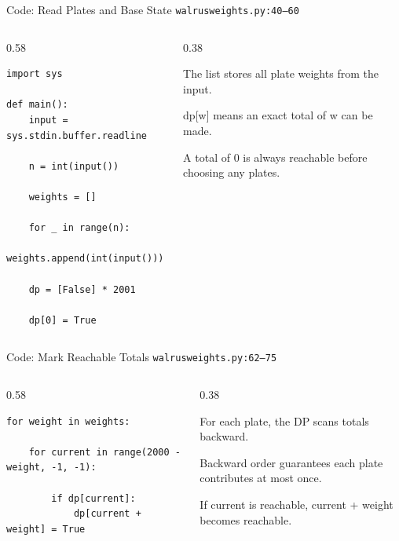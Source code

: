\documentclass[aspectratio=169,11pt]{beamer}
\begin{document}
\begin{frame}[fragile]{Code: Read Plates and Base State}
\scriptsize
{} \texttt{walrusweights.py:40--60}

\vspace{0.08cm}
\begin{columns}[T,totalwidth=\textwidth]
\begin{column}{0.58\textwidth}
\begin{lstlisting}[style=cpcode]
import sys

def main():
    input = sys.stdin.buffer.readline

    n = int(input())

    weights = []

    for _ in range(n):
        weights.append(int(input()))

    dp = [False] * 2001

    dp[0] = True
\end{lstlisting}
\end{column}
\begin{column}{0.38\textwidth}
\begin{tightitemize}
  \item The list stores all plate weights from the input.
  \item dp[w] means an exact total of w can be made.
  \item A total of 0 is always reachable before choosing any plates.
\end{tightitemize}
\end{column}
\end{columns}
\end{frame}

\begin{frame}[fragile]{Code: Mark Reachable Totals}
\scriptsize
{} \texttt{walrusweights.py:62--75}

\vspace{0.08cm}
\begin{columns}[T,totalwidth=\textwidth]
\begin{column}{0.58\textwidth}
\begin{lstlisting}[style=cpcode]
for weight in weights:

    for current in range(2000 - weight, -1, -1):

        if dp[current]:
            dp[current + weight] = True
\end{lstlisting}
\end{column}
\begin{column}{0.38\textwidth}
\begin{tightitemize}
  \item For each plate, the DP scans totals backward.
  \item Backward order guarantees each plate contributes at most once.
  \item If current is reachable, current + weight becomes reachable.
\end{tightitemize}
\end{column}
\end{columns}
\end{frame}
\end{document}
